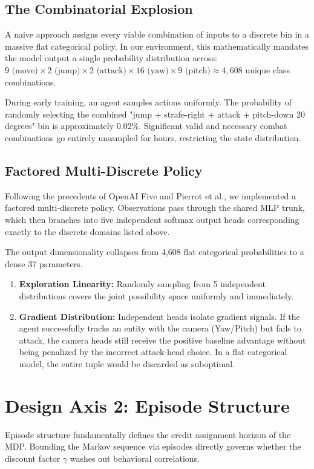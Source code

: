 \documentclass[conference]{IEEEtran}
\begin{document}
\subsection{The Combinatorial Explosion}
A naive approach assigns every viable combination of inputs to a discrete bin in a massive flat categorical policy. In our environment, this mathematically mandates the model output a single probability distribution across:
$9 \text{ (move)} \times 2 \text{ (jump)} \times 2 \text{ (attack)} \times 16 \text{ (yaw)} \times 9 \text{ (pitch)} \approx 4,608$ unique class combinations.

During early training, an agent samples actions uniformly. The probability of randomly selecting the combined "jump + strafe-right + attack + pitch-down 20 degrees" bin is approximately 0.02\%. Significant valid and necessary combat combinations go entirely unsampled for hours, restricting the state distribution.

\subsection{Factored Multi-Discrete Policy}
Following the precedents of OpenAI Five and Pierrot et al., we implemented a factored multi-discrete policy. Observations pass through the shared MLP trunk, which then branches into five independent softmax output heads corresponding exactly to the discrete domains listed above. 

The output dimensionality collapses from 4,608 flat categorical probabilities to a dense 37 parameters. 
\begin{enumerate}
    \item \textbf{Exploration Linearity:} Randomly sampling from 5 independent distributions covers the joint possibility space uniformly and immediately.
    \item \textbf{Gradient Distribution:} Independent heads isolate gradient signals. If the agent successfully tracks an entity with the camera (Yaw/Pitch) but fails to attack, the camera heads still receive the positive baseline advantage without being penalized by the incorrect attack-head choice. In a flat categorical model, the entire tuple would be discarded as suboptimal.
\end{enumerate}


\section{Design Axis 2: Episode Structure}
Episode structure fundamentally defines the credit assignment horizon of the MDP. Bounding the Markov sequence via episodes directly governs whether the discount factor $\gamma$ washes out behavioral correlations.
\end{document}
